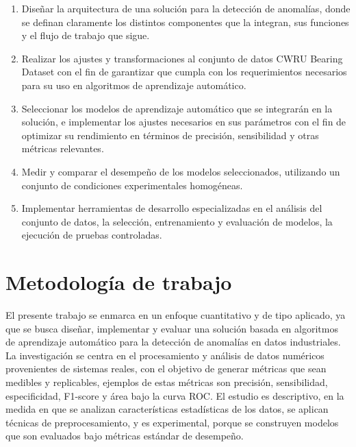 \documentclass[11pt,a4paper,spanish]{book}
\numberwithin{equation}{chapter}
\numberwithin{figure}{chapter}
\begin{document}
\begin{enumerate}

\item Diseñar la arquitectura de una solución para la detección de anomalías, donde 
se definan claramente los distintos componentes que la integran, sus funciones y 
el flujo de trabajo que sigue. 


\item Realizar los ajustes y transformaciones al conjunto de datos CWRU Bearing Dataset 
con el fin de garantizar que cumpla con los requerimientos necesarios para su uso 
en algoritmos de aprendizaje automático.  


\item Seleccionar los modelos de aprendizaje automático que se integrarán en la solución,
e implementar los ajustes necesarios en sus parámetros con el fin de optimizar su rendimiento 
en términos de precisión, sensibilidad y otras métricas relevantes.


\item Medir y comparar el desempeño de los modelos seleccionados, 
utilizando un conjunto de condiciones experimentales homogéneas.


\item Implementar herramientas de desarrollo especializadas en el análisis del 
conjunto de datos, la selección, entrenamiento y evaluación de modelos, 
la ejecución de pruebas controladas. 

\end{enumerate}


\chapter{Metodología de trabajo}


El presente trabajo se enmarca en un enfoque cuantitativo y de tipo aplicado, ya que se 
busca diseñar, implementar y evaluar una solución basada en algoritmos de aprendizaje 
automático para la detección de anomalías en datos industriales. La investigación se 
centra en el procesamiento y análisis de datos numéricos provenientes de sistemas reales,
con el objetivo de generar métricas que sean medibles y replicables, ejemplos de estas 
métricas son precisión, sensibilidad, especificidad, F1-score y área bajo la curva ROC.
El estudio es descriptivo, en la medida en que se analizan características estadísticas 
de los datos, se aplican técnicas de preprocesamiento, y es experimental, porque se 
construyen modelos que son evaluados bajo métricas estándar de desempeño. 
\end{document}
